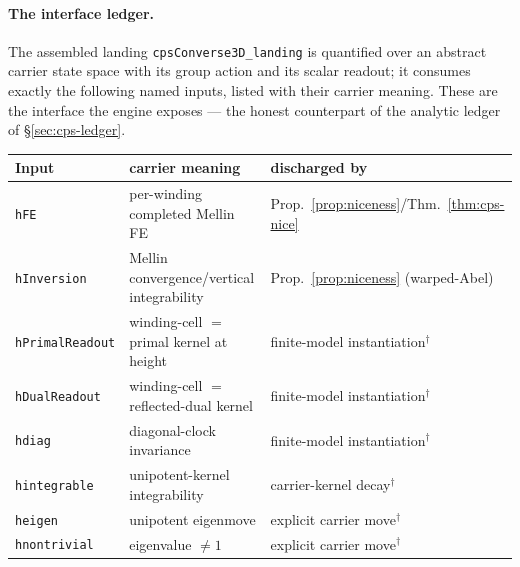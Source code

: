 \documentclass[11pt]{article}
\theoremstyle{definition}
\begin{document}
\paragraph{The interface ledger.} The assembled landing \texttt{cpsConverse3D\_landing} is quantified over
an abstract carrier state space with its group action and its scalar readout; it consumes exactly the
following named inputs, listed with their carrier meaning. These are the interface the engine exposes ---
the honest counterpart of the analytic ledger of \S\ref{sec:cps-ledger}.
\begin{center}
\begin{tabular}{@{}lll@{}}
\toprule
Input & carrier meaning & discharged by \\
\midrule
\texttt{hFE} & per-winding completed Mellin FE & Prop.~\ref{prop:niceness}/Thm.~\ref{thm:cps-nice} \\
\texttt{hInversion} & Mellin convergence/vertical integrability & Prop.~\ref{prop:niceness} (warped-Abel) \\
\texttt{hPrimalReadout} & winding-cell $=$ primal kernel at height & finite-model instantiation$^\dagger$ \\
\texttt{hDualReadout} & winding-cell $=$ reflected-dual kernel & finite-model instantiation$^\dagger$ \\
\texttt{hdiag} & diagonal-clock invariance & finite-model instantiation$^\dagger$ \\
\texttt{hintegrable} & unipotent-kernel integrability & carrier-kernel decay$^\dagger$ \\
\texttt{heigen} & unipotent eigenmove & explicit carrier move$^\dagger$ \\
\texttt{hnontrivial} & eigenvalue $\neq 1$ & explicit carrier move$^\dagger$ \\
\bottomrule
\end{tabular}
\end{center}
\end{document}
